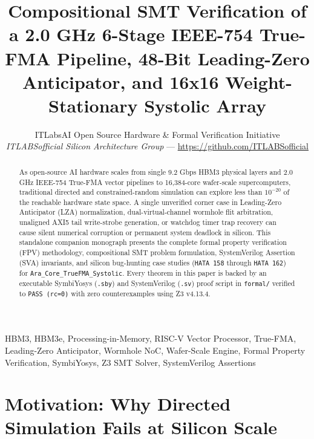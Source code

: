 \documentclass[journal,10pt,twocolumn]{IEEEtran}
\title{Compositional SMT Verification of a 2.0 GHz 6-Stage IEEE-754 True-FMA Pipeline, 48-Bit Leading-Zero Anticipator, and 16x16 Weight-Stationary Systolic Array}
\author{ITLabsAI Open Source Hardware \& Formal Verification Initiative\\
\textit{ITLABSofficial Silicon Architecture Group} --- \url{https://github.com/ITLABSofficial}}
\begin{document}
\maketitle
\begin{abstract}
As open-source AI hardware scales from single 9.2 Gbps HBM3 physical layers and 2.0 GHz IEEE-754 True-FMA vector pipelines to 16,384-core wafer-scale supercomputers, traditional directed and constrained-random simulation can explore less than $10^{-20}$ of the reachable hardware state space. A single unverified corner case in Leading-Zero Anticipator (LZA) normalization, dual-virtual-channel wormhole flit arbitration, unaligned AXI5 tail write-strobe generation, or watchdog timer trap recovery can cause silent numerical corruption or permanent system deadlock in silicon. This standalone companion monograph presents the complete formal property verification (FPV) methodology, compositional SMT problem formulation, SystemVerilog Assertion (SVA) invariants, and silicon bug-hunting case studies (\texttt{HATA 158} through \texttt{HATA 162}) for \texttt{Ara\_Core\_TrueFMA\_Systolic}. Every theorem in this paper is backed by an executable SymbiYosys (\texttt{.sby}) and SystemVerilog (\texttt{.sv}) proof script in \texttt{formal/} verified to \texttt{PASS (rc=0)} with zero counterexamples using Z3 v4.13.4.
\end{abstract}
\begin{IEEEkeywords}
HBM3, HBM3e, Processing-in-Memory, RISC-V Vector Processor, True-FMA, Leading-Zero Anticipator, Wormhole NoC, Wafer-Scale Engine, Formal Property Verification, SymbiYosys, Z3 SMT Solver, SystemVerilog Assertions
\end{IEEEkeywords}


\section{Motivation: Why Directed Simulation Fails at Silicon Scale}
\end{document}
